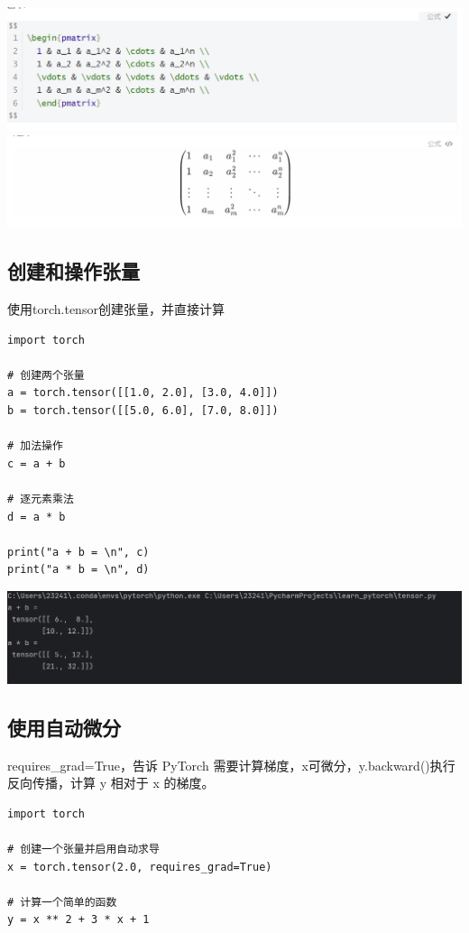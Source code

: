 \documentclass[UTF8,a4paper]{ctexart}
\begin{document}
\begin{sloppypar}
	\includegraphics[width = 16cm]{91}
	\includegraphics[width = 16cm]{92}
	
	
	\subsection{创建和操作张量}
	使用torch.tensor创建张量，并直接计算


	\begin{lstlisting}
import torch

# 创建两个张量
a = torch.tensor([[1.0, 2.0], [3.0, 4.0]])
b = torch.tensor([[5.0, 6.0], [7.0, 8.0]])

# 加法操作
c = a + b

# 逐元素乘法
d = a * b

print("a + b = \n", c)
print("a * b = \n", d)
	\end{lstlisting}
	
	\includegraphics[width = 16cm]{10}
	
	
	\subsection{使用自动微分}
	requires\_grad=True，告诉 PyTorch 需要计算梯度，x可微分，y.backward()执行反向传播，计算 y 相对于 x 的梯度。
	\begin{lstlisting}
import torch

# 创建一个张量并启用自动求导
x = torch.tensor(2.0, requires_grad=True)

# 计算一个简单的函数
y = x ** 2 + 3 * x + 1


\end{lstlisting}
\end{sloppypar}
\end{document}
